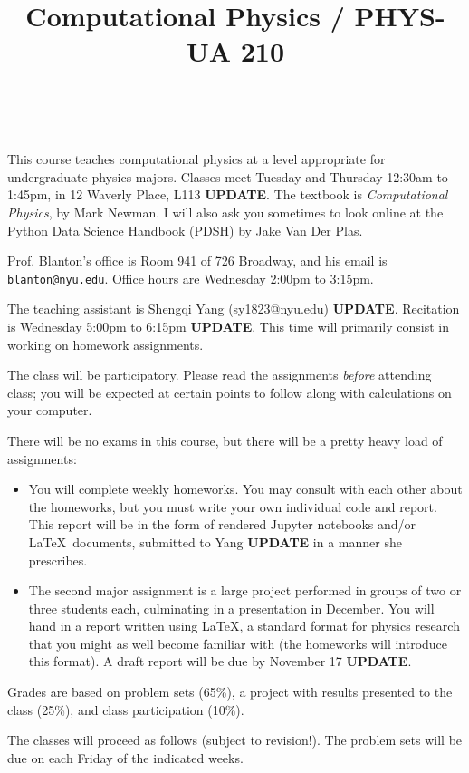 \documentclass[11pt, preprint]{aastex}
\begin{document}
\title{\bf Computational Physics / PHYS-UA 210}
~
~

\noindent This course teaches computational physics at a level
appropriate for undergraduate physics majors.  Classes meet Tuesday
and Thursday 12:30am to 1:45pm, in 12 Waverly Place, L113 {\bf
  UPDATE}.  The textbook is {\it Computational Physics}, by Mark
Newman. I will also ask you sometimes to look online at the Python
Data Science Handbook (PDSH) by Jake Van Der Plas.

\noindent Prof. Blanton's office is Room 941 of 726 Broadway, and his
email is {\tt blanton@nyu.edu}.  Office hours are Wednesday 2:00pm to
3:15pm.

\noindent The teaching assistant is Shengqi Yang (sy1823@nyu.edu) {\bf
  UPDATE}. Recitation is Wednesday 5:00pm to 6:15pm {\bf UPDATE}. This
time will primarily consist in working on homework assignments.

\noindent The class will be participatory. Please read the assignments
          {\it before} attending class; you will be expected at
          certain points to follow along with calculations on your
          computer.

\noindent There will be no exams in this course, but there will be a
pretty heavy load of assignments:
\begin{itemize}
\item You will complete weekly homeworks. You may consult with each
  other about the homeworks, but you must write your own individual
  code and report. This report will be in the form of rendered Jupyter
  notebooks and/or \LaTeX\ documents, submitted to Yang {\bf UPDATE}
  in a manner she prescribes.
\item The second major assignment is a large project performed in
  groups of two or three students each, culminating in a presentation
  in December. You will hand in a report written using \LaTeX, a
  standard format for physics research that you might as well become
  familiar with (the homeworks will introduce this format). A draft
  report will be due by November 17 {\bf UPDATE}.
\end{itemize}

\noindent Grades are based on problem sets (65\%), a project with
results presented to the class (25\%), and class participation (10\%).

\noindent The classes will proceed as follows (subject to revision!).
The problem sets will be due on each Friday of the indicated weeks.
\end{document}
